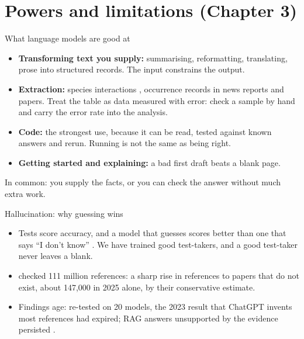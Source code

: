 \documentclass[11pt,aspectratio=169]{beamer}
\begin{document}
\section{Powers and limitations (Chapter 3)}

\begin{frame}{What language models are good at}
  \small
  \begin{itemize}
    \item \textbf{Transforming text you supply:} summarising, reformatting,
      translating, prose into structured records. The input constrains the
      output.
    \item \textbf{Extraction:} species interactions
      \parencite{keck2026interactions}, occurrence records in news reports and
      papers. Treat the table as data measured with error: check a sample by
      hand and carry the error rate into the analysis.
    \item \textbf{Code:} the strongest use, because it can be read, tested
      against known answers and rerun. Running is not the same as being right.
    \item \textbf{Getting started and explaining:} a bad first draft beats a
      blank page.
  \end{itemize}
  \medskip
  In common: you supply the facts, or you can check the answer without much
  extra work.
\end{frame}

\begin{frame}{Hallucination: why guessing wins}
  \small
  \begin{itemize}
    \item Tests score accuracy, and a model that guesses scores better than
      one that says ``I don't know'' \parencite{kalai2025hallucinate}. We have
      trained good test-takers, and a good test-taker never leaves a blank.
    \item \textcite{zhao2026citations} checked 111 million references: a sharp
      rise in references to papers that do not exist, about 147,000 in 2025
      alone, by their conservative estimate.
    \item Findings age: re-tested on 20 models, the 2023 result that ChatGPT
      invents most references had expired; RAG answers unsupported by the
      evidence persisted \parencite{queen2026shelflife}.
  \end{itemize}
\end{frame}
\end{document}
